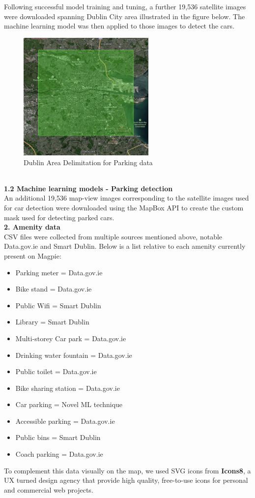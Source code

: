 Following successful model training and tuning, a further 19,536 satellite images were downloaded spanning Dublin City area illustrated in the figure below. The machine learning model was then applied to those images to detect the cars.
\begin{figure}[h!]
    \centering
    \includegraphics[width=0.6\textwidth]{images/dublin-img-area.jpg}
    \caption{Dublin Area Delimitation for Parking data}
\end{figure}\\

\textbf{1.2 Machine learning models - Parking detection}\\
An additional 19,536 map-view images corresponding to the satellite images used for car detection were downloaded using the MapBox API to create the custom mask used for detecting parked cars.\\

\textbf{2. Amenity data}\\
CSV files were collected from multiple sources mentioned above, notable Data.gov.ie and Smart Dublin. Below is a list relative to each amenity currently present on Magpie:
\begin{itemize}
    \item Parking meter = Data.gov.ie
    \item Bike stand = Data.gov.ie
    \item Public Wifi = Smart Dublin
    \item Library = Smart Dublin
    \item Multi-storey Car park = Data.gov.ie
    \item Drinking water fountain = Data.gov.ie
    \item Public toilet = Data.gov.ie
    \item Bike sharing station = Data.gov.ie
    \item Car parking = Novel ML technique
    \item Accessible parking = Data.gov.ie
    \item Public bins = Smart Dublin
    \item Coach parking = Data.gov.ie
\end{itemize}
To complement this data visually on the map, we used SVG icons from \textbf{Icons8}, a UX turned design agency that provide high quality, free-to-use icons for personal and commercial web projects.\\

